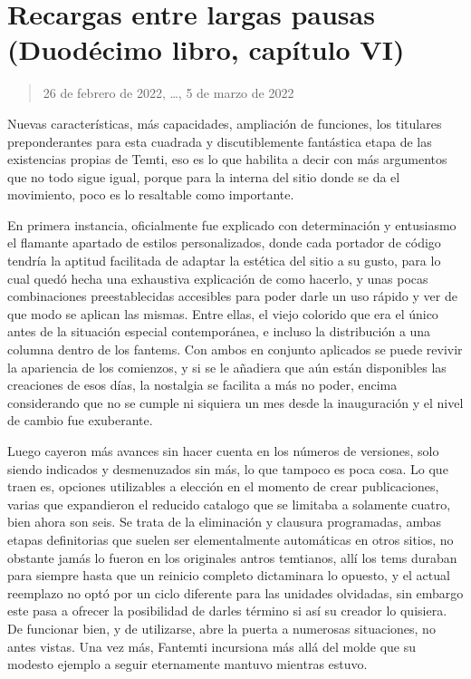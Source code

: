 \documentclass[
]{book}
\begin{document}
\hypertarget{recargas-entre-largas-pausas-duoduxe9cimo-libro-capuxedtulo-vi}{%
\section{Recargas entre largas pausas (Duodécimo libro, capítulo VI)}\label{recargas-entre-largas-pausas-duoduxe9cimo-libro-capuxedtulo-vi}}

\begin{quote}
26 de febrero de 2022, \ldots, 5 de marzo de 2022
\end{quote}

Nuevas características, más capacidades, ampliación de funciones, los titulares preponderantes para esta cuadrada y discutiblemente fantástica etapa de las existencias propias de Temti, eso es lo que habilita a decir con más argumentos que no todo sigue igual, porque para la interna del sitio donde se da el movimiento, poco es lo resaltable como importante.

En primera instancia, oficialmente fue explicado con determinación y entusiasmo el flamante apartado de estilos personalizados, donde cada portador de código tendría la aptitud facilitada de adaptar la estética del sitio a su gusto, para lo cual quedó hecha una exhaustiva explicación de como hacerlo, y unas pocas combinaciones preestablecidas accesibles para poder darle un uso rápido y ver de que modo se aplican las mismas. Entre ellas, el viejo colorido que era el único antes de la situación especial contemporánea, e incluso la distribución a una columna dentro de los fantems. Con ambos en conjunto aplicados se puede revivir la apariencia de los comienzos, y si se le añadiera que aún están disponibles las creaciones de esos días, la nostalgia se facilita a más no poder, encima considerando que no se cumple ni siquiera un mes desde la inauguración y el nivel de cambio fue exuberante.

Luego cayeron más avances sin hacer cuenta en los números de versiones, solo siendo indicados y desmenuzados sin más, lo que tampoco es poca cosa. Lo que traen es, opciones utilizables a elección en el momento de crear publicaciones, varias que expandieron el reducido catalogo que se limitaba a solamente cuatro, bien ahora son seis. Se trata de la eliminación y clausura programadas, ambas etapas definitorias que suelen ser elementalmente automáticas en otros sitios, no obstante jamás lo fueron en los originales antros temtianos, allí los tems duraban para siempre hasta que un reinicio completo dictaminara lo opuesto, y el actual reemplazo no optó por un ciclo diferente para las unidades olvidadas, sin embargo este pasa a ofrecer la posibilidad de darles término si así su creador lo quisiera. De funcionar bien, y de utilizarse, abre la puerta a numerosas situaciones, no antes vistas. Una vez más, Fantemti incursiona más allá del molde que su modesto ejemplo a seguir eternamente mantuvo mientras estuvo.
\end{document}
